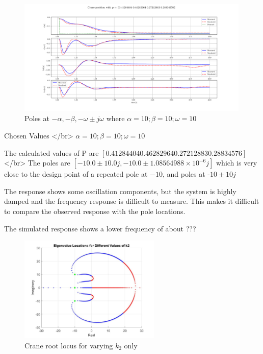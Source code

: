 \documentclass{article}
\begin{document}
\begin{figure}[H]
  \centering
  \includegraphics[width=0.99\textwidth]{figures/3.4b.png}
  \caption{Poles at $-\alpha, -\beta, -\omega \pm j\omega$ where $\alpha = 10; \beta = 10; \omega = 10$}
  \label{fig:exp3.4b}
\end{figure}

Chosen Values </br>
$\alpha = 10; \beta = 10; \omega = 10$

The calculated values of P are $[0.41284404 0.46282964 0.27212883 0.28834576]$ </br>
The poles are $[-10.0 \pm 10.0j, -10.0\pm 1.08564988\times 10^{-6}j ]$ which is very close to the design point of a repeated pole at $-10$, and poles at -$10\pm 10j$

The response shows some oscillation components, but the system is highly damped and the frequency response is difficult to measure.
This makes it difficult to compare the observed response with the pole locations.

The simulated response shows a lower frequency of about ???


\begin{figure}[H]
  \centering
  \includegraphics[width=0.6\textwidth]{figures/3.5roots.jpg}
  \caption{Crane root locus for varying $k_2$ only}
  \label{fig:roots3.5}
\end{figure}
\end{document}
